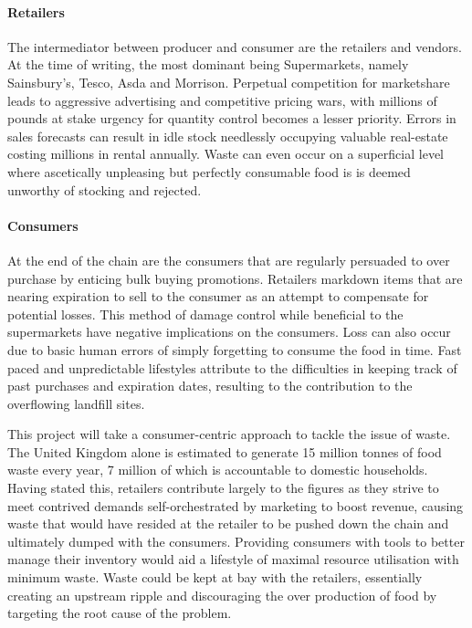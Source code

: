 \documentclass[a4paper, 11pt]{article}
\begin{document}
\paragraph{Retailers}The intermediator between producer and consumer are the retailers and vendors. At the time of writing, the most dominant being Supermarkets, namely Sainsbury's, Tesco, Asda and Morrison. Perpetual competition for marketshare leads to aggressive advertising and competitive pricing wars, with millions of pounds at stake urgency for quantity control becomes a lesser priority. Errors in sales forecasts can result in idle stock needlessly occupying valuable real-estate costing millions in rental annually. Waste can even occur on a superficial level where ascetically unpleasing but perfectly consumable food is is deemed unworthy of stocking and rejected.\cite{FoodWaste} 

\paragraph{Consumers}At the end of the chain are the consumers that are regularly persuaded to over purchase by enticing bulk buying promotions. Retailers markdown items that are nearing expiration to sell  to the consumer as an attempt to compensate for potential losses. This method of damage control while beneficial to the supermarkets have negative implications on the consumers. Loss can also occur due to basic human errors of simply forgetting to consume the food in time. Fast paced and unpredictable lifestyles attribute to the difficulties in keeping track of past purchases and expiration dates, resulting to the  contribution to the overflowing landfill sites.\cite{FoodWaste} 

\vspace{\baselineskip}

This project will take a consumer-centric approach to tackle the issue of waste. The United Kingdom alone is estimated to generate 15 million tonnes of food waste every year, 7 million of which is accountable to domestic households.\cite{statistic} Having stated this, retailers contribute largely to the figures as they strive to meet contrived demands self-orchestrated by marketing to boost revenue, causing waste that would have resided at the retailer to be pushed down the chain and ultimately dumped with the consumers.\cite{waste} Providing consumers with tools to better manage their inventory would aid a lifestyle of maximal resource utilisation with minimum waste. Waste could be kept at bay with the retailers, essentially creating an upstream ripple and discouraging the over production of food by targeting the root cause of the problem.
\end{document}
